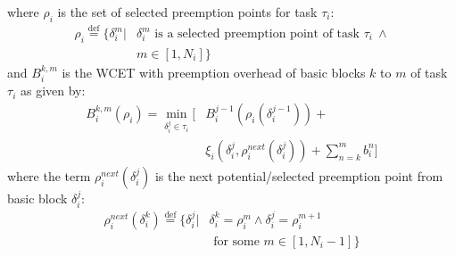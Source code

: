 \noindent
where \begin{math}\rho_{i}\end{math} is the set of selected preemption points for task \begin{math}\tau_{i}\end{math}:
\begin{equation*}\label{eqn:pp-set}
\begin{split}
   \rho_{i} \stackrel{\text{def}}{=} \{\delta_{i}^{m}|&\delta_{i}^{m} \text{ is a selected preemption point of task } \tau_{i}\ \wedge \\ &m \in [1,N_{i}]\}
\end{split}
\end{equation*}
%
\noindent
and \begin{math}B_{i}^{k,m}\end{math} is the WCET with preemption overhead of basic blocks $k$ to $m$ of task \begin{math}\tau_{i}\end{math} as given by:
\begin{equation}\label{eqn:bbkwcet-cost}
\begin{split}
   B_{i}^{k,m}(\rho_{i}) = \min_{\delta_{i}^{j} \in \tau_{i}} \Big[&B_{i}^{j-1}(\rho_{i}(\delta_{i}^{j-1})) + \\ &\xi_{i}(\delta_{i}^{j},\rho_{i}^{next}(\delta_{i}^{j})) + \sum_{n=k}^{m}b_{i}^{n}\Big]
\end{split}
\end{equation}
%
\noindent
where the term \begin{math}\rho_{i}^{next}(\delta_{i}^{j})\end{math} is the next potential/selected preemption point from basic block \begin{math}\delta_{i}^{j}\end{math}:
\begin{equation}\label{eqn:ppnext-set}
\begin{split}
   \rho_{i}^{next}(\delta_{i}^{k}) \stackrel{\text{def}}{=} \{\delta_{i}^{j}|&\delta_{i}^{k} = \rho_{i}^{m} \wedge \delta_{i}^{j} = \rho_{i}^{m+1} \\ &\textrm{ for some } m \in [1,N_{i}-1]\}
\end{split}
\end{equation}

